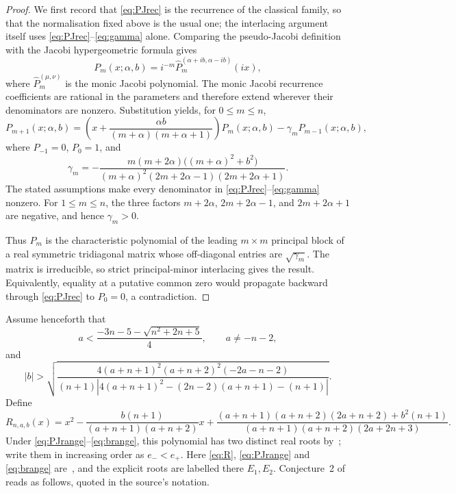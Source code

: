 \documentclass[11pt]{amsart}
\theoremstyle{remark}
\begin{document}
\begin{proof}
We first record that \eqref{eq:PJrec} is the recurrence of the classical
family, so that the normalisation fixed above is the usual one; the interlacing
argument itself uses \eqref{eq:PJrec}--\eqref{eq:gamma} alone.
Comparing the pseudo-Jacobi definition with the Jacobi hypergeometric formula
\cite[\href{https://dlmf.nist.gov/18.5.E7}{(18.5.7)}]{DLMF} gives
\[
 P_m(x;\alpha,b)
 =i^{-m}\widehat P_m^{(\alpha+ib,\alpha-ib)}(ix),
\]
where $\widehat P_m^{(\mu,\nu)}$ is the monic Jacobi polynomial.  The monic
Jacobi recurrence coefficients
\cite[\href{https://dlmf.nist.gov/3.5.E33_1}{(3.5.33\_1)}]{DLMF} are rational in
the parameters and therefore extend wherever their denominators are nonzero.
Substitution yields, for $0\le m\le n$,
\begin{equation}\label{eq:PJrec}
 P_{m+1}(x;\alpha,b)
 =\left(x+\frac{\alpha b}{(m+\alpha)(m+\alpha+1)}\right)P_m(x;\alpha,b)
 -\gamma_mP_{m-1}(x;\alpha,b),
\end{equation}
where $P_{-1}=0$, $P_0=1$, and
\begin{equation}\label{eq:gamma}
 \gamma_m
 =-\frac{m(m+2\alpha)\bigl((m+\alpha)^2+b^2\bigr)}
 {(m+\alpha)^2(2m+2\alpha-1)(2m+2\alpha+1)}.
\end{equation}
The stated assumptions make every denominator in
\eqref{eq:PJrec}--\eqref{eq:gamma} nonzero.  For $1\le m\le n$, the three
factors $m+2\alpha$, $2m+2\alpha-1$, and $2m+2\alpha+1$ are negative, and hence
$\gamma_m>0$.

Thus $P_m$ is the characteristic polynomial of the leading $m\times m$
principal block of a real symmetric tridiagonal matrix whose off-diagonal
entries are $\sqrt{\gamma_m}$.  The matrix is irreducible, so strict
principal-minor interlacing gives the result.  Equivalently, equality at a
putative common zero would propagate backward through \eqref{eq:PJrec} to
$P_0=0$, a contradiction.
\end{proof}

Assume henceforth that
\begin{equation}\label{eq:PJrange}
 a<\frac{-3n-5-\sqrt{n^2+2n+5}}4,
 \qquad a\ne-n-2,
\end{equation}
and
\begin{equation}\label{eq:brange}
 |b|>
 \sqrt{\frac{4(a+n+1)^2(a+n+2)^2(-2a-n-2)}
 {(n+1)\left|4(a+n+1)^2-(2n-2)(a+n+1)-(n+1)\right|}}.
\end{equation}
Define
\begin{equation}\label{eq:R}
 R_{n,a,b}(x)
 =x^2-\frac{b(n+1)}{(a+n+1)(a+n+2)}x
 +\frac{(a+n+1)(a+n+2)(2a+n+2)+b^2(n+1)}
 {(a+n+1)(a+n+2)(2a+2n+3)}.
\end{equation}
Under \eqref{eq:PJrange}--\eqref{eq:brange}, this polynomial has two distinct
real roots by~\cite[Lemma~6.1]{JordaanKumar}; write them in increasing order as
$e_-<e_+$.  Here \eqref{eq:R}, \eqref{eq:PJrange} and \eqref{eq:brange}
are~\cite[(6.2), (6.3), (6.4)]{JordaanKumar}, and the explicit roots
\cite[(6.8)--(6.9)]{JordaanKumar} are labelled there $E_1,E_2$.  Conjecture~2
of~\cite{JordaanKumar} reads as follows, quoted in the source's notation.
\end{document}
